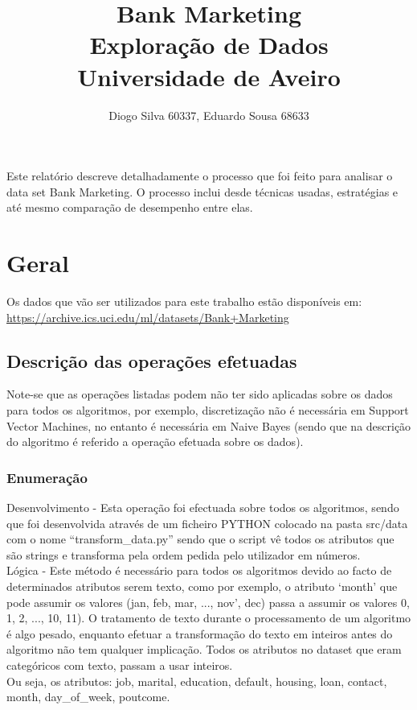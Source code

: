 \documentclass[portugues,final]{revdetua}
\begin{document}

\title{\textbf{Bank Marketing}\\ Exploração de Dados \\Universidade de Aveiro}
\author{Diogo Silva 60337, Eduardo Sousa 68633}
\maketitle
\begin{resumo} %
Este relatório descreve detalhadamente o processo que foi feito para analisar o data set Bank Marketing.
O processo inclui desde técnicas usadas, estratégias e até mesmo comparação de desempenho entre elas.
\end{resumo}

\section{Geral}

Os dados que vão ser utilizados para este trabalho estão disponíveis em:
\url{https://archive.ics.uci.edu/ml/datasets/Bank+Marketing}

\subsection{Descrição das operações efetuadas}

Note-se que as operações listadas podem não ter sido aplicadas sobre os dados para todos os algoritmos, por exemplo, discretização não é necessária em Support Vector Machines, no entanto é necessária em Naive Bayes (sendo que na descrição do algoritmo é referido a operação efetuada sobre os dados).

\subsubsection{Enumeração}


Desenvolvimento - Esta operação foi efectuada sobre todos os algoritmos, sendo que foi desenvolvida através de um ficheiro PYTHON colocado na pasta src/data com o nome “transform\_data.py” sendo que o script vê todos os atributos que são strings e transforma pela ordem pedida pelo utilizador em números.\\

Lógica - Este método é necessário para todos os algoritmos devido ao facto de determinados atributos serem texto, como por exemplo, o atributo ‘month’ que pode assumir os valores (jan, feb, mar, ..., nov', dec) passa a assumir os valores 0, 1, 2, ..., 10, 11). O tratamento de texto durante o processamento de um algoritmo é algo pesado, enquanto efetuar a transformação do texto em inteiros antes do algoritmo não tem qualquer implicação.
Todos os atributos no dataset que eram categóricos com texto, passam a usar inteiros.\\
Ou seja, os atributos: job, marital, education, default, housing, loan, contact, month, day\_of\_week, poutcome.
\end{document}
